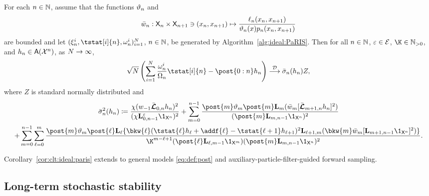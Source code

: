 \begin{corollary} \label{cor:clt:ideal:paris}
For each $n \in \mathbb{N}$, assume that the functions $\vartheta_{n}$ and  
$$
\wgtfuncideal{n} : \Xset_n \times \Xset_{n + 1} \ni (x_n, x_{n + 1}) \mapsto \frac{\ud{n}(x_n, x_{n + 1})}{\adjfuncforward{n}(x) \kissforward{n}{n}(x_n, x_{n + 1})} 
$$
are bounded and let $(\epart{n}{i}, \tstat[i]{n}, \ewght{n}{i})_{i = 1}^\N$, $n \in \mathbb{N}$, be generated by Algorithm~\ref{alg:ideal:PaRIS}. Then for all $n \in \mathbb{N}$, $\varepsilon \in \mathcal{E}$, $\K \in \nsetpos$, and $h_n \in \mathsf{A}(\mathcal{X}^n)$, as $N \to \infty$,
$$
\sqrt{\N} \left( \sum_{i = 1}^\N \frac{\ewght{n}{i}}{\sumwght{n}} \tstat[i]{n} - \post{0:n} h_n  \right) \dlim \bar{\sigma}_n (h_n) Z, 
$$
where $Z$ is standard normally distributed and
\begin{multline} \label{eq:as:var:ideal:PaRIS}
\bar{\sigma}^2_n (h_n) 
\eqdef \frac{\chi(\initwgtfunc \retroknorm_{0, n} h_n)^2}{(\chi \ukmod{0, n - 1} \1_{\Xset^n})^2} + \sum_{m = 0}^{n - 1} \frac{\post{m} \adjfuncforward{m} \post{m} \uk{m}(\wgtfuncideal{m} [\retroknorm_{m + 1, n} h_n ]^2)}{(\post{m} \uk{m, n - 1} \1_{\Xset^n})^2} \\
+ \sum_{m = 0}^{n - 1} \sum_{\ell = 0}^m \frac{\post{m} \adjfuncforward{m} \post{\ell} \uk{\ell} \{\bkw{\ell}(\tstat{\ell} h_{\ell} + \addf{\ell} - \tstat{\ell + 1} h_{\ell +1})^2 \uk{\ell + 1, m}( \bkw{m} \wgtfuncideal{m} [\uk{m + 1, n - 1} \1_{\Xset^n}]^2
)\}}{\K^{m - \ell + 1} (\post{\ell} \uk{\ell, m - 1} \1_{\Xset^m})(\post{m} \uk{m, n - 1} \1_{\Xset^n})^2}. 
\end{multline}
\end{corollary}

Corollary~\ref{cor:clt:ideal:paris} extends \cite[Corollary~5]{olsson:westerborn:2017} to general models \eqref{eq:def:post} and auxiliary-particle-filter-guided forward sampling. 

\subsection{Long-term stochastic stability}

